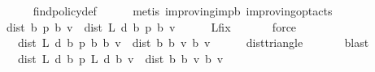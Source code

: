 \begin{isabellebody}
\ \ \ \ \isamarkupfalse%
\ find{\isacharunderscore}{\kern0pt}policy{\isacharprime}{\kern0pt}{\isacharunderscore}{\kern0pt}def\isanewline
\ \ \ \ \isamarkupfalse%
\ {\isacharparenleft}{\kern0pt}metis\ {\isasymnu}{\isacharunderscore}{\kern0pt}improving{\isacharunderscore}{\kern0pt}imp{\isacharunderscore}{\kern0pt}{\isasymL}\isactrlsub b\ {\isasymnu}{\isacharunderscore}{\kern0pt}improving{\isacharunderscore}{\kern0pt}opt{\isacharunderscore}{\kern0pt}acts{\isacharparenright}{\kern0pt}\isanewline
\ \ \isamarkupfalse%
\ {\isachardoublequoteopen}dist\ {\isacharparenleft}{\kern0pt}{\isasymnu}\isactrlsub b\ {\isacharquery}{\kern0pt}p{\isacharparenright}{\kern0pt}\ {\isacharparenleft}{\kern0pt}{\isasymL}\isactrlsub b\ v{\isacharparenright}{\kern0pt}\ {\isacharequal}{\kern0pt}\ dist\ {\isacharparenleft}{\kern0pt}L\ {\isacharquery}{\kern0pt}d\ {\isacharparenleft}{\kern0pt}{\isasymnu}\isactrlsub b\ {\isacharquery}{\kern0pt}p{\isacharparenright}{\kern0pt}{\isacharparenright}{\kern0pt}\ {\isacharparenleft}{\kern0pt}{\isasymL}\isactrlsub b\ v{\isacharparenright}{\kern0pt}{\isachardoublequoteclose}\isanewline
\ \ \ \ \isamarkupfalse%
\ L{\isacharunderscore}{\kern0pt}{\isasymnu}{\isacharunderscore}{\kern0pt}fix\ \isanewline
\ \ \ \ \isamarkupfalse%
\ force\isanewline
\ \ \isamarkupfalse%
\ \isamarkupfalse%
\ {\isachardoublequoteopen}{\isasymdots}\ {\isasymle}\ dist\ {\isacharparenleft}{\kern0pt}L\ {\isacharquery}{\kern0pt}d\ {\isacharparenleft}{\kern0pt}{\isasymnu}\isactrlsub b\ {\isacharquery}{\kern0pt}p{\isacharparenright}{\kern0pt}{\isacharparenright}{\kern0pt}\ {\isacharparenleft}{\kern0pt}{\isasymL}\isactrlsub b\ {\isacharparenleft}{\kern0pt}{\isasymL}\isactrlsub b\ v{\isacharparenright}{\kern0pt}{\isacharparenright}{\kern0pt}\ {\isacharplus}{\kern0pt}\ dist\ {\isacharparenleft}{\kern0pt}{\isasymL}\isactrlsub b\ {\isacharparenleft}{\kern0pt}{\isasymL}\isactrlsub b\ v{\isacharparenright}{\kern0pt}{\isacharparenright}{\kern0pt}\ {\isacharparenleft}{\kern0pt}{\isasymL}\isactrlsub b\ v{\isacharparenright}{\kern0pt}{\isachardoublequoteclose}\isanewline
\ \ \ \ \isamarkupfalse%
\ dist{\isacharunderscore}{\kern0pt}triangle\ \isanewline
\ \ \ \ \isamarkupfalse%
\ blast\isanewline
\ \ \isamarkupfalse%
\ \isamarkupfalse%
\ {\isachardoublequoteopen}{\isasymdots}\ {\isacharequal}{\kern0pt}\ dist\ {\isacharparenleft}{\kern0pt}L\ {\isacharquery}{\kern0pt}d\ {\isacharparenleft}{\kern0pt}{\isasymnu}\isactrlsub b\ {\isacharquery}{\kern0pt}p{\isacharparenright}{\kern0pt}{\isacharparenright}{\kern0pt}\ {\isacharparenleft}{\kern0pt}L\ {\isacharquery}{\kern0pt}d\ {\isacharparenleft}{\kern0pt}{\isasymL}\isactrlsub b\ v{\isacharparenright}{\kern0pt}{\isacharparenright}{\kern0pt}\ {\isacharplus}{\kern0pt}\ dist\ {\isacharparenleft}{\kern0pt}{\isasymL}\isactrlsub b\ {\isacharparenleft}{\kern0pt}{\isasymL}\isactrlsub b\ v{\isacharparenright}{\kern0pt}{\isacharparenright}{\kern0pt}\ {\isacharparenleft}{\kern0pt}{\isasymL}\isactrlsub b\ v{\isacharparenright}{\kern0pt}{\isachardoublequoteclose}\isanewline

\end{isabellebody}
